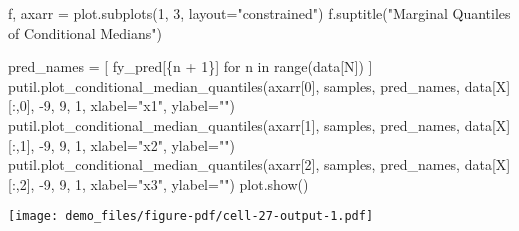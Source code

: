 \documentclass[
  letterpaper,
  DIV=11,
  numbers=noendperiod]{scrartcl}
\newenvironment{Shaded}{\begin{snugshade}}{\end{snugshade}}
\newcommand{\BuiltInTok}[1]{\textcolor[rgb]{0.00,0.23,0.31}{#1}}
\newcommand{\ControlFlowTok}[1]{\textcolor[rgb]{0.00,0.23,0.31}{#1}}
\newcommand{\DecValTok}[1]{\textcolor[rgb]{0.68,0.00,0.00}{#1}}
\newcommand{\KeywordTok}[1]{\textcolor[rgb]{0.00,0.23,0.31}{#1}}
\newcommand{\NormalTok}[1]{\textcolor[rgb]{0.00,0.23,0.31}{#1}}
\newcommand{\OperatorTok}[1]{\textcolor[rgb]{0.37,0.37,0.37}{#1}}
\newcommand{\SpecialCharTok}[1]{\textcolor[rgb]{0.37,0.37,0.37}{#1}}
\newcommand{\SpecialStringTok}[1]{\textcolor[rgb]{0.13,0.47,0.30}{#1}}
\newcommand{\StringTok}[1]{\textcolor[rgb]{0.13,0.47,0.30}{#1}}
\begin{document}
\begin{Shaded}
\begin{Highlighting}[]
\NormalTok{f, axarr }\OperatorTok{=}\NormalTok{ plot.subplots(}\DecValTok{1}\NormalTok{, }\DecValTok{3}\NormalTok{, layout}\OperatorTok{=}\StringTok{"constrained"}\NormalTok{)}
\NormalTok{f.suptitle(}\StringTok{"Marginal Quantiles of Conditional Medians"}\NormalTok{)}

\NormalTok{pred\_names }\OperatorTok{=}\NormalTok{ [ }\SpecialStringTok{f\textquotesingle{}y\_pred[}\SpecialCharTok{\{}\NormalTok{n }\OperatorTok{+} \DecValTok{1}\SpecialCharTok{\}}\SpecialStringTok{]\textquotesingle{}} \ControlFlowTok{for}\NormalTok{ n }\KeywordTok{in} \BuiltInTok{range}\NormalTok{(data[}\StringTok{\textquotesingle{}N\textquotesingle{}}\NormalTok{]) ]}
\NormalTok{putil.plot\_conditional\_median\_quantiles(axarr[}\DecValTok{0}\NormalTok{], samples, pred\_names,}
\NormalTok{                                        data[}\StringTok{\textquotesingle{}X\textquotesingle{}}\NormalTok{][:,}\DecValTok{0}\NormalTok{], }\OperatorTok{{-}}\DecValTok{9}\NormalTok{, }\DecValTok{9}\NormalTok{, }\DecValTok{1}\NormalTok{,}
\NormalTok{                                        xlabel}\OperatorTok{=}\StringTok{"x1"}\NormalTok{, ylabel}\OperatorTok{=}\StringTok{""}\NormalTok{)}
\NormalTok{putil.plot\_conditional\_median\_quantiles(axarr[}\DecValTok{1}\NormalTok{], samples, pred\_names,}
\NormalTok{                                        data[}\StringTok{\textquotesingle{}X\textquotesingle{}}\NormalTok{][:,}\DecValTok{1}\NormalTok{], }\OperatorTok{{-}}\DecValTok{9}\NormalTok{, }\DecValTok{9}\NormalTok{, }\DecValTok{1}\NormalTok{,}
\NormalTok{                                        xlabel}\OperatorTok{=}\StringTok{"x2"}\NormalTok{, ylabel}\OperatorTok{=}\StringTok{""}\NormalTok{)}
\NormalTok{putil.plot\_conditional\_median\_quantiles(axarr[}\DecValTok{2}\NormalTok{], samples, pred\_names,}
\NormalTok{                                        data[}\StringTok{\textquotesingle{}X\textquotesingle{}}\NormalTok{][:,}\DecValTok{2}\NormalTok{], }\OperatorTok{{-}}\DecValTok{9}\NormalTok{, }\DecValTok{9}\NormalTok{, }\DecValTok{1}\NormalTok{,}
\NormalTok{                                        xlabel}\OperatorTok{=}\StringTok{"x3"}\NormalTok{, ylabel}\OperatorTok{=}\StringTok{""}\NormalTok{)}
\NormalTok{plot.show()}
\end{Highlighting}
\end{Shaded}

\texttt{[image: demo\_files/figure-pdf/cell-27-output-1.pdf]}
\end{document}
